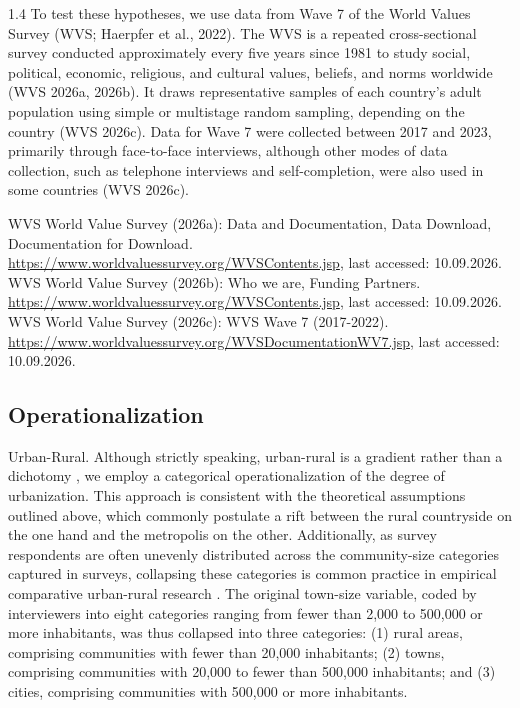 \documentclass[10pt, letterpaper]{article}
\begin{document}
\begin{spacing}{1.4}
To test these hypotheses, we use data from Wave 7 of the World Values Survey
(WVS; Haerpfer et al., 2022). The WVS is a repeated cross-sectional survey
conducted approximately every five years since 1981 to study social, political,
economic, religious, and cultural values, beliefs, and norms worldwide (WVS
2026a, 2026b). It draws representative samples of each country's adult
population using simple or multistage random sampling, depending on the country
(WVS 2026c). Data for Wave 7 were collected between 2017 and 2023, primarily
through face-to-face interviews, although other modes of data collection, such
as telephone interviews and self-completion, were also used in some countries
(WVS 2026c).

WVS  World Value Survey (2026a): Data and Documentation, Data Download, Documentation for Download. \url{https://www.worldvaluessurvey.org/WVSContents.jsp}, last accessed: 10.09.2026.
WVS  World Value Survey (2026b): Who we are, Funding Partners. \url{https://www.worldvaluessurvey.org/WVSContents.jsp}, last accessed: 10.09.2026.
WVS  World Value Survey (2026c): WVS Wave 7 (2017-2022). \url{https://www.worldvaluessurvey.org/WVSDocumentationWV7.jsp}, last accessed: 10.09.2026.



\subsection{Operationalization}

Urban-Rural. Although strictly speaking, urban-rural is a gradient rather than a
dichotomy \citep{aok-ls_fisher16}, we employ a categorical operationalization of
the degree of urbanization. This approach is consistent with the theoretical
assumptions outlined above, which commonly postulate a rift between the rural
countryside on the one hand and the metropolis on the other. Additionally, as
survey respondents are often unevenly distributed across the community-size
categories captured in surveys, collapsing these categories is common practice
in empirical comparative urban-rural research \citep{aok21}. The original town-size
variable, coded by interviewers into eight categories ranging from fewer than
2,000 to 500,000 or more inhabitants, was thus collapsed into three categories:
(1) rural areas, comprising communities with fewer than 20,000 inhabitants; (2)
towns, comprising communities with 20,000 to fewer than 500,000 inhabitants; and
(3) cities, comprising communities with 500,000 or more inhabitants.


\end{spacing}
\end{document}
